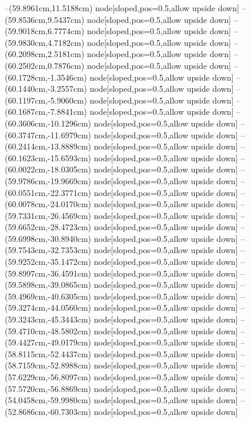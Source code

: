--(59.8961cm,11.5188cm) node[sloped,pos=0.5,allow upside down]{\ArrowIn}
--(59.8536cm,9.5437cm) node[sloped,pos=0.5,allow upside down]{\ArrowIn}
--(59.9018cm,6.7774cm) node[sloped,pos=0.5,allow upside down]{\ArrowIn}
--(59.9830cm,4.7182cm) node[sloped,pos=0.5,allow upside down]{\ArrowIn}
--(60.2098cm,2.5181cm) node[sloped,pos=0.5,allow upside down]{\ArrowIn}
--(60.2502cm,0.7876cm) node[sloped,pos=0.5,allow upside down]{\ArrowIn}
--(60.1728cm,-1.3546cm) node[sloped,pos=0.5,allow upside down]{\ArrowIn}
--(60.1440cm,-3.2557cm) node[sloped,pos=0.5,allow upside down]{\ArrowIn}
--(60.1197cm,-5.9060cm) node[sloped,pos=0.5,allow upside down]{\ArrowIn}
--(60.1687cm,-7.8841cm) node[sloped,pos=0.5,allow upside down]{\ArrowIn}
--(60.3606cm,-10.1296cm) node[sloped,pos=0.5,allow upside down]{\ArrowIn}
--(60.3747cm,-11.6979cm) node[sloped,pos=0.5,allow upside down]{\ArrowIn}
--(60.2414cm,-13.8889cm) node[sloped,pos=0.5,allow upside down]{\ArrowIn}
--(60.1623cm,-15.6593cm) node[sloped,pos=0.5,allow upside down]{\ArrowIn}
--(60.0022cm,-18.0305cm) node[sloped,pos=0.5,allow upside down]{\ArrowIn}
--(59.9786cm,-19.9669cm) node[sloped,pos=0.5,allow upside down]{\ArrowIn}
--(60.0551cm,-22.3771cm) node[sloped,pos=0.5,allow upside down]{\ArrowIn}
--(60.0078cm,-24.0170cm) node[sloped,pos=0.5,allow upside down]{\ArrowIn}
--(59.7331cm,-26.4569cm) node[sloped,pos=0.5,allow upside down]{\ArrowIn}
--(59.6652cm,-28.4723cm) node[sloped,pos=0.5,allow upside down]{\ArrowIn}
--(59.6998cm,-30.8940cm) node[sloped,pos=0.5,allow upside down]{\ArrowIn}
--(59.7543cm,-32.7353cm) node[sloped,pos=0.5,allow upside down]{\ArrowIn}
--(59.9252cm,-35.1472cm) node[sloped,pos=0.5,allow upside down]{\ArrowIn}
--(59.8997cm,-36.4591cm) node[sloped,pos=0.5,allow upside down]{\ArrowIn}
--(59.5898cm,-39.0865cm) node[sloped,pos=0.5,allow upside down]{\ArrowIn}
--(59.4969cm,-40.6305cm) node[sloped,pos=0.5,allow upside down]{\ArrowIn}
--(59.3274cm,-44.0560cm) node[sloped,pos=0.5,allow upside down]{\ArrowIn}
--(59.3243cm,-45.3443cm) node[sloped,pos=0.5,allow upside down]{\ArrowIn}
--(59.4710cm,-48.5802cm) node[sloped,pos=0.5,allow upside down]{\ArrowIn}
--(59.4427cm,-49.0179cm) node[sloped,pos=0.5,allow upside down]{\arrowIn}
--(58.8115cm,-52.4437cm) node[sloped,pos=0.5,allow upside down]{\ArrowIn}
--(58.7159cm,-52.8988cm) node[sloped,pos=0.5,allow upside down]{\arrowIn}
--(57.6229cm,-56.8097cm) node[sloped,pos=0.5,allow upside down]{\ArrowIn}
--(57.5720cm,-56.8869cm) node[sloped,pos=0.5,allow upside down]{\arrowIn}
--(54.0458cm,-59.9980cm) node[sloped,pos=0.5,allow upside down]{\ArrowIn}
--(52.8686cm,-60.7303cm) node[sloped,pos=0.5,allow upside down]{\ArrowIn}
